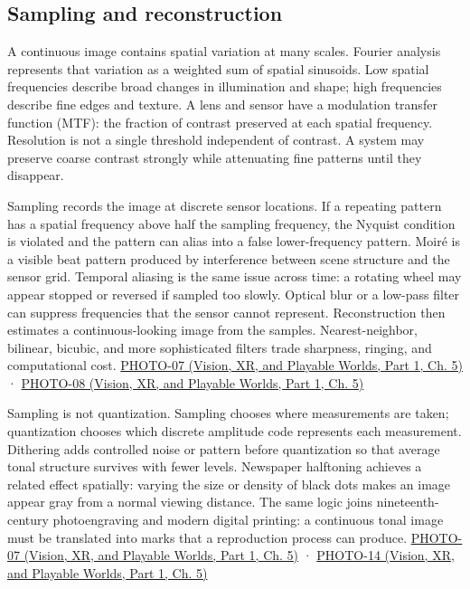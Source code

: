 \subsection{Sampling and reconstruction}\label{03-visual-computing-i-ch003-sampling-and-reconstruction}

\hypertarget{03-visual-computing-i-ch003-sampling-and-reconstruction}{}

A continuous image contains spatial variation at many scales. Fourier analysis represents that variation as a weighted sum of spatial sinusoids. Low spatial frequencies describe broad changes in illumination and shape; high frequencies describe fine edges and texture. A lens and sensor have a modulation transfer function (MTF): the fraction of contrast preserved at each spatial frequency. Resolution is not a single threshold independent of contrast. A system may preserve coarse contrast strongly while attenuating fine patterns until they disappear.

Sampling records the image at discrete sensor locations. If a repeating pattern has a spatial frequency above half the sampling frequency, the Nyquist condition is violated and the pattern can alias into a false lower-frequency pattern. Moiré is a visible beat pattern produced by interference between scene structure and the sensor grid. Temporal aliasing is the same issue across time: a rotating wheel may appear stopped or reversed if sampled too slowly. Optical blur or a low-pass filter can suppress frequencies that the sensor cannot represent. Reconstruction then estimates a continuous-looking image from the samples. Nearest-neighbor, bilinear, bicubic, and more sophisticated filters trade sharpness, ringing, and computational cost. \href{../07-Vision-XR-and-Playable-Worlds-P01/main.pdf\#nameddest=04-visual-computing-ii-ch036-photo-07---photography-session-07}{PHOTO-07 (Vision, XR, and Playable Worlds, Part 1, Ch. 5)} · \href{../07-Vision-XR-and-Playable-Worlds-P01/main.pdf\#nameddest=04-visual-computing-ii-ch036-photo-08---photography-session-08}{PHOTO-08 (Vision, XR, and Playable Worlds, Part 1, Ch. 5)}

Sampling is not quantization. Sampling chooses where measurements are taken; quantization chooses which discrete amplitude code represents each measurement. Dithering adds controlled noise or pattern before quantization so that average tonal structure survives with fewer levels. Newspaper halftoning achieves a related effect spatially: varying the size or density of black dots makes an image appear gray from a normal viewing distance. The same logic joins nineteenth-century photoengraving and modern digital printing: a continuous tonal image must be translated into marks that a reproduction process can produce. \href{../07-Vision-XR-and-Playable-Worlds-P01/main.pdf\#nameddest=04-visual-computing-ii-ch036-photo-07---photography-session-07}{PHOTO-07 (Vision, XR, and Playable Worlds, Part 1, Ch. 5)} · \href{../07-Vision-XR-and-Playable-Worlds-P01/main.pdf\#nameddest=04-visual-computing-ii-ch036-photo-14---photography-session-14}{PHOTO-14 (Vision, XR, and Playable Worlds, Part 1, Ch. 5)}


